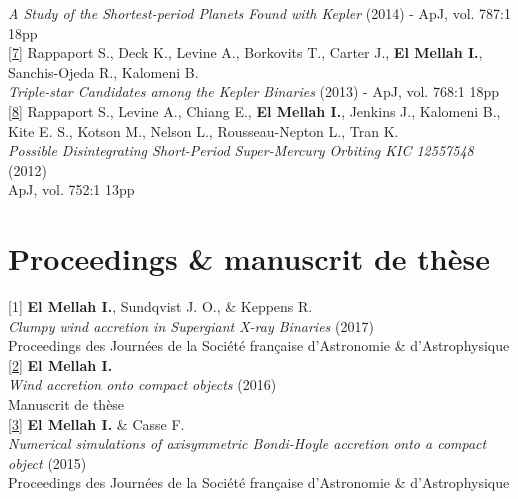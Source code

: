 \documentclass[a4paper,oneside]{article}
\begin{document}
\begin{flushleft}
\emph{A Study of the Shortest-period Planets Found with Kepler} (2014) - ApJ, vol. 787:1 18pp\\ 
\vspace*{0.3cm}
\href{http://iopscience.iop.org/article/10.1088/0004-637X/768/1/33/meta}{[7]} Rappaport S., Deck K., Levine A., Borkovits T., Carter J., \textbf{El Mellah I.}, \\
Sanchis-Ojeda R., Kalomeni B.\\ 
\emph{Triple-star Candidates among the Kepler Binaries} (2013) - ApJ, vol. 768:1 18pp\\
\vspace*{0.3cm}
\href{http://iopscience.iop.org/article/10.1088/0004-637X/752/1/1}{[8]} Rappaport S., Levine A., Chiang E., \textbf{El Mellah I.}, Jenkins J., Kalomeni B.,\\
Kite E. S., Kotson M., Nelson L., Rousseau-Nepton L., Tran K. \\ 
\emph{Possible Disintegrating Short-Period Super-Mercury Orbiting KIC 12557548} (2012)\\
ApJ, vol. 752:1 13pp \\

\end{flushleft}

\section*{Proceedings \& manuscrit de thèse}

\begin{flushleft}

[1] \textbf{El Mellah I.}, Sundqvist J. O., \& Keppens R. \\ 
\emph{Clumpy wind accretion in Supergiant X-ray Binaries} (2017)\\
Proceedings des Journées de la Société fran\c caise d'Astronomie \& d'Astrophysique\\
\vspace*{0.3cm}
\href{http://adsabs.harvard.edu/abs/2017arXiv170709165E}{[2]} \textbf{El Mellah I.}\\ 
\emph{Wind accretion onto compact objects} (2016)\\
Manuscrit de thèse\\
\vspace*{0.3cm}
\href{http://adsabs.harvard.edu/abs/2015sf2a.conf..325E}{[3]} \textbf{El Mellah I.} \& Casse F. \\ 
\emph{Numerical simulations of axisymmetric Bondi-Hoyle accretion onto a compact object} (2015)\\
Proceedings des Journées de la Société fran\c caise d'Astronomie \& d'Astrophysique\\
\vspace*{0.3cm}

\end{flushleft}
\end{document}
